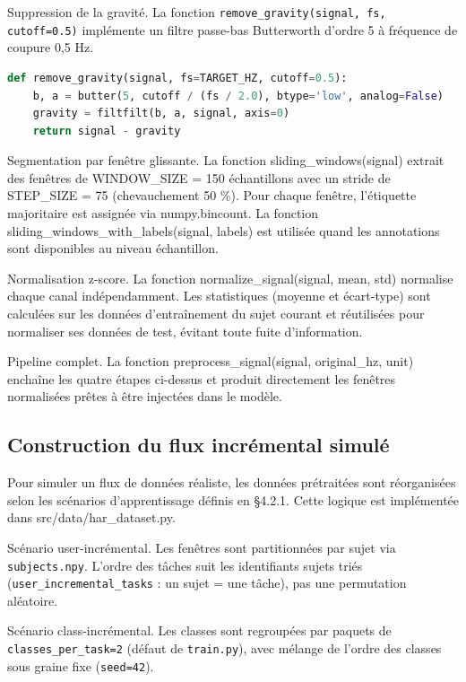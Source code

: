 Suppression de la gravité. La fonction \texttt{remove\_gravity(signal, fs, cutoff=0.5)} implémente un filtre passe-bas Butterworth d'ordre 5 à fréquence de coupure 0,5 Hz.

\begin{lstlisting}[language=Python,caption={Suppression de la composante gravitationnelle},label=lst:gravity]
def remove_gravity(signal, fs=TARGET_HZ, cutoff=0.5):
    b, a = butter(5, cutoff / (fs / 2.0), btype='low', analog=False)
    gravity = filtfilt(b, a, signal, axis=0)
    return signal - gravity
\end{lstlisting}

Segmentation par fenêtre glissante. La fonction sliding\_windows(signal) extrait des fenêtres de WINDOW\_SIZE = 150 échantillons avec un stride de STEP\_SIZE = 75 (chevauchement 50 \%). Pour chaque fenêtre, l'étiquette majoritaire est assignée via numpy.bincount. La fonction sliding\_windows\_with\_labels(signal, labels) est utilisée quand les annotations sont disponibles au niveau échantillon.

Normalisation z-score. La fonction normalize\_signal(signal, mean, std) normalise chaque canal indépendamment. Les statistiques (moyenne et écart-type) sont calculées sur les données d'entraînement du sujet courant et réutilisées pour normaliser ses données de test, évitant toute fuite d'information.

Pipeline complet. La fonction preprocess\_signal(signal, original\_hz, unit) enchaîne les quatre étapes ci-dessus et produit directement les fenêtres normalisées prêtes à être injectées dans le modèle.

\subsection{Construction du flux incrémental simulé}

Pour simuler un flux de données réaliste, les données prétraitées sont réorganisées selon les scénarios d'apprentissage définis en §4.2.1. Cette logique est implémentée dans src/data/har\_dataset.py.

Scénario user-incrémental. Les fenêtres sont partitionnées par sujet via
\texttt{subjects.npy}. L'ordre des tâches suit les identifiants sujets
triés (\texttt{user\_incremental\_tasks} : un sujet = une tâche), pas une
permutation aléatoire.

Scénario class-incrémental. Les classes sont regroupées par paquets de
\texttt{classes\_per\_task=2} (défaut de \texttt{train.py}), avec mélange de
l'ordre des classes sous graine fixe (\texttt{seed=42}).

